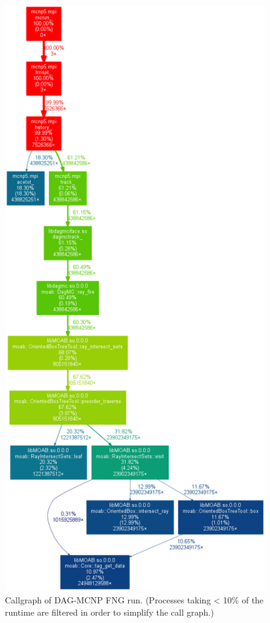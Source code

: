 \documentclass[10pt, a4paper]{article}
\begin{document}
\begin{figure}[H]
  \centering
  \caption{Callgraph of DAG-MCNP FNG run. (Processes taking < 10\% of the runtime are filtered in order to simplify the call graph.) }
  \label{dagmc-fng-coarse}
  \includegraphics[scale=0.35]{dagmc_fng_cg_coarse.png}
\end{figure}
\end{document}
